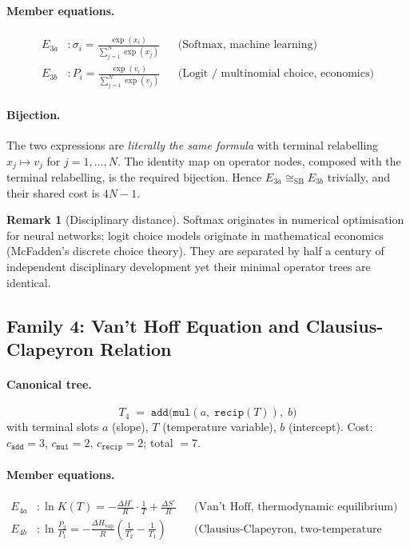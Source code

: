\documentclass[12pt,a4paper]{article}
\theoremstyle{definition}
\newtheorem{remark}[theorem]{Remark}
\newcommand{\mmul}{\mathtt{mul}}
\newcommand{\madd}{\mathtt{add}}
\newcommand{\mrecip}{\mathtt{recip}}
\newcommand{\siso}{\cong_{\mathrm{SB}}}
\begin{document}
\paragraph{Member equations.}
\begin{align*}
  E_{3a} &: \sigma_i
    = \frac{\exp(x_i)}{\sum_{j=1}^{N} \exp(x_j)}
    && \text{(Softmax, machine learning)} \\
  E_{3b} &: P_i
    = \frac{\exp(v_i)}{\sum_{j=1}^{N} \exp(v_j)}
    && \text{(Logit / multinomial choice, economics)}
\end{align*}

\paragraph{Bijection.}
The two expressions are \emph{literally the same formula} with terminal
relabelling $x_j \mapsto v_j$ for $j = 1, \ldots, N$.  The identity map on
operator nodes, composed with the terminal relabelling, is the required
bijection.  Hence $E_{3a} \siso E_{3b}$ trivially, and their shared cost is
$4N - 1$.

\begin{remark}[Disciplinary distance]
Softmax originates in numerical optimisation for neural networks; logit choice
models originate in mathematical economics (McFadden's discrete choice theory).
They are separated by half a century of independent disciplinary development yet
their minimal operator trees are identical.
\end{remark}

\subsection{Family 4: Van't Hoff Equation and Clausius-Clapeyron Relation}
\label{sec:fam4}

\paragraph{Canonical tree.}
\[
  T_4 \;=\; \madd\!\bigl(\mmul(a,\;\mrecip(T)),\;b\bigr)
\]
with terminal slots $a$ (slope), $T$ (temperature variable), $b$ (intercept).
Cost: $c_{\madd} = 3$, $c_{\mmul} = 2$, $c_{\mrecip} = 2$; total $= 7$.

\paragraph{Member equations.}
\begin{align*}
  E_{4a} &: \ln K(T)
    = -\frac{\Delta H^\circ}{R}\cdot\frac{1}{T} + \frac{\Delta S^\circ}{R}
    && \text{(Van't Hoff, thermodynamic equilibrium)} \\[4pt]
  E_{4b} &: \ln\frac{P_2}{P_1}
    = -\frac{\Delta H_{\mathrm{vap}}}{R}\!\left(\frac{1}{T_2}-\frac{1}{T_1}\right)
    && \text{(Clausius-Clapeyron, two-temperature form)}
\end{align*}
\end{document}
